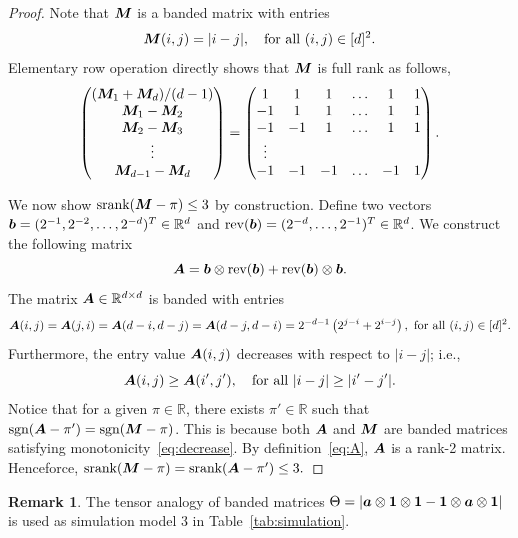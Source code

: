 \documentclass[11pt]{article}
\theoremstyle{plain}
\theoremstyle{definition}
\newtheorem{rmk}{Remark}
\def\sign{\textup{sgn}}
\def\srank{\textup{srank}}
\begin{document}
\begin{proof}
Note that $\bm M$ is a banded matrix with entries
\[
\bm M(i,j)={|i-j|}, \quad \text{for all }(i,j)\in[d]^2.
\]
Elementary row operation directly shows that $\bm M$ is full rank as follows,
\begin{align}
\begin{pmatrix}
(\bm M_1+\bm M_d)/(d-1)\\
\bm M_1-\bm M_2\\
\bm M_2-\bm M_3\\
\vdots\\
\bm M_{d-1}-\bm M_{d}
\end{pmatrix} = 
\begin{pmatrix}
1&1&1&\ldots&1&1\\
-1&1&1&\ldots&1&1\\
-1&-1&1&\ldots&1&1\\
\vdots\\
-1&-1&-1&\ldots&-1&1
\end{pmatrix}.
\end{align}

We now show $\srank(\mM-\pi)\leq 3$ by construction. Define two vectors $\bm{b}=(2^{-1},2^{-2},\ldots,2^{-d})^T\in\mathbb{R}^d$ and $\text{rev}(\bm{b})=(2^{-d},\ldots,2^{-1})^T\in\mathbb{R}^d$. We construct the following matrix
\begin{equation}\label{eq:A}
\bm A=\bm{b}\otimes\text{rev}(\bm{b})+\text{rev}(\bm{b})\otimes\bm{b}.
\end{equation}
The matrix $\bm A\in\mathbb{R}^{d\times d}$ is banded with entries
\[
\mA(i,j)=\mA(j,i)=\mA(d-i,d-j)=\mA(d-j,d-i)=2^{-d-1}\left(2^{j-i}+2^{i-j}\right),\ \text{for all }(i,j)\in[d]^2.
\] 
Furthermore, the entry value $\bm A(i,j)$ decreases with respect to $|i-j|$; i.e., 
\begin{equation}\label{eq:decrease}
\bm A(i,j) \geq \bm A(i',j'), \quad \text{for all }|i-j|\geq |i'-j'|.
\end{equation}
Notice that for a given $\pi\in\mathbb{R}$, there exists $\pi'\in\mathbb{R}$ such that $\sign(\mA-\pi')=\sign(\mM-\pi)$. This is because both $\bm A$ and $\bm M$ are banded matrices satisfying monotonicity~\eqref{eq:decrease}. By definition~\eqref{eq:A}, $\bm A$ is a rank-2 matrix. Henceforce, $\srank(\mM-\pi)=\srank(\mA-\pi')\leq 3.$
\end{proof}

\begin{rmk} The tensor analogy of banded matrices $\Theta=|\bm{a}\otimes\mathbf{1}\otimes \mathbf{1}-\mathbf{1}\otimes\bm{a}\otimes \mathbf{1}|$ is used as simulation model 3 in Table~\ref{tab:simulation}.  
\end{rmk}
\end{document}
